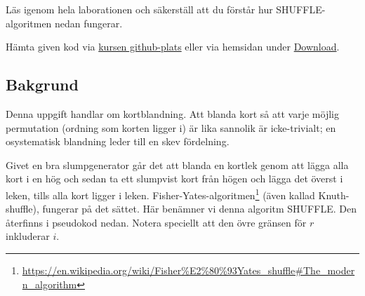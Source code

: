 

\Lab{\LabWeekSEVEN}

\begin{Goals}

\end{Goals}

\begin{Preparations}
\item {}
\item Läs igenom hela laborationen och säkerställ att du förstår hur SHUFFLE-algoritmen nedan fungerar.

\item Hämta given kod via \href{https://github.com/lunduniversity/introprog/tree/master/workspace/}{kursen github-plats} eller via hemsidan under \href{https://cs.lth.se/pgk/download/}{Download}.

\end{Preparations}

\subsection{Bakgrund}\label{knuth-shuffle}

Denna uppgift handlar om kortblandning. Att blanda kort så att varje möjlig permutation (ordning som korten ligger i) är lika sannolik är icke-trivialt; en osystematisk blandning leder till en skev fördelning.

Givet en bra slumpgenerator går det att blanda en kortlek genom att lägga alla kort i en hög och sedan ta ett slumpvist kort från högen och lägga det överst i leken, tills alla kort ligger i leken. Fisher-Yates-algoritmen\footnote{\href{https://en.wikipedia.org/wiki/Fisher\%E2\%80\%93Yates_shuffle\#The_modern_algorithm}{https://en.wikipedia.org/wiki/Fisher\%E2\%80\%93Yates\_shuffle\#The\_modern\_algorithm}} (även kallad Knuth-shuffle), fungerar på det sättet. Här benämner vi denna algoritm SHUFFLE. Den återfinns i pseudokod nedan. Notera speciellt att den övre gränsen för $r$ inkluderar $i$.

\begin{algorithm}[H]
\end{algorithm}

